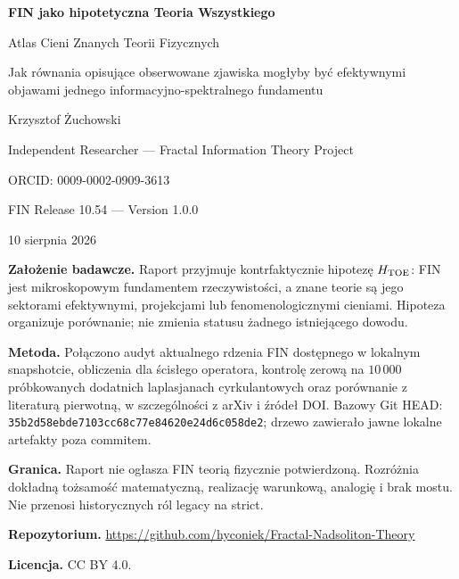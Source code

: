 \documentclass[11pt,a4paper]{article}
\begin{document}
\begin{titlepage}
\centering
\vspace*{1.7cm}
{\LARGE\bfseries FIN jako hipotetyczna Teoria Wszystkiego\par}
\vspace{0.55cm}
{\Large Atlas Cieni Znanych Teorii Fizycznych\par}
\vspace{0.5cm}
{\large Jak równania opisujące obserwowane zjawiska mogłyby być efektywnymi objawami jednego informacyjno-spektralnego fundamentu\par}
\vspace{1.45cm}
{\Large Krzysztof Żuchowski\par}
\vspace{0.28cm}
{\large Independent Researcher --- Fractal Information Theory Project\par}
{\large ORCID: 0009-0002-0909-3613\par}
\vspace{1.25cm}
{\large FIN Release 10.54 --- Version 1.0.0\par}
{\large 10 sierpnia 2026\par}
\vfill
\begin{minipage}{0.86\textwidth}
\textbf{Założenie badawcze.} Raport przyjmuje kontrfaktycznie hipotezę $H_{\rm TOE}$: FIN jest mikroskopowym fundamentem rzeczywistości, a znane teorie są jego sektorami efektywnymi, projekcjami lub fenomenologicznymi cieniami. Hipoteza organizuje porównanie; nie zmienia statusu żadnego istniejącego dowodu.\par
\textbf{Metoda.} Połączono audyt aktualnego rdzenia FIN dostępnego w lokalnym snapshotcie, obliczenia dla ścisłego operatora, kontrolę zerową na $10\,000$ próbkowanych dodatnich laplasjanach cyrkulantowych oraz porównanie z literaturą pierwotną, w szczególności z arXiv i źródeł DOI. Bazowy Git HEAD: \texttt{35b2d58ebde7103cc68c77e84620e24d6c058de2}; drzewo zawierało jawne lokalne artefakty poza commitem.\par
\textbf{Granica.} Raport nie ogłasza FIN teorią fizycznie potwierdzoną. Rozróżnia dokładną tożsamość matematyczną, realizację warunkową, analogię i brak mostu. Nie przenosi historycznych ról legacy na strict.\par
\textbf{Repozytorium.} \url{https://github.com/hyconiek/Fractal-Nadsoliton-Theory}\par
\textbf{Licencja.} CC BY 4.0.
\end{minipage}
\end{titlepage}
\end{document}

